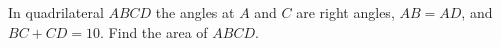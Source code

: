 In quadrilateral $ABCD$ the angles at $A$ and $C$ are right angles, $AB=AD$, and $BC+CD=10$. Find the area of $ABCD$.
